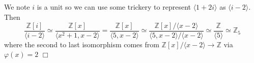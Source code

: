 \documentclass{article}
\begin{document}
\subsection{}
We note $i$ is a unit so we can use some trickery to represent $\langle 1 + 2i \rangle$ as $\langle i - 2 \rangle$. Then
$$\frac{\mathbb{Z}[i]}{\langle i-2 \rangle} \simeq \frac{\mathbb{Z}[x]}{\langle x^2+1, x-2 \rangle} = \frac{\mathbb{Z}[x]}{\langle 5, x-2 \rangle} \simeq \frac{\mathbb{Z}[x]/\langle x-2 \rangle}{\langle 5, x-2 \rangle/\langle x-2 \rangle} \simeq \frac{\mathbb{Z}}{\langle 5 \rangle} \simeq \mathbb{Z}_5$$
where the second to last isomorphism comes from $\mathbb{Z}[x]/\langle x-2 \rangle \to \mathbb{Z}$ via $\varphi(x) = 2$ $\Box$
\end{document}
